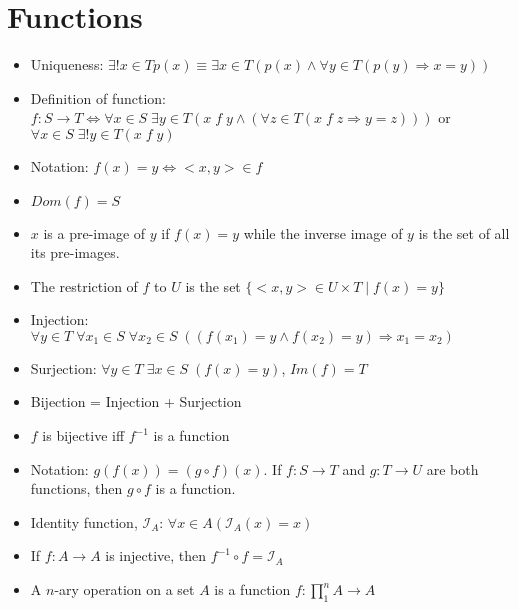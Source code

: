 \documentclass[11pt, twocolumn]{article}
\newenvironment{compactitem}
{\begin{itemize}
  \setlength{\itemsep}{1px}
  \setlength{\parskip}{0pt}
  \setlength{\parsep}{0pt}}
{\end{itemize}}
\begin{document}
\section{Functions}
\begin{compactitem}
\item Uniqueness: $\exists!x\in T p(x) \equiv \exists x \in T (p(x) \wedge \forall y \in T (p(y) \Rightarrow x=y))$ 
\item Definition of function: $f: S \rightarrow T \Leftrightarrow \forall x \in S \;\exists y \in T (x\;f\;y \wedge (\forall z \in T (x\;f\;z \Rightarrow y=z)))$ or $\forall x\in S \;\exists!y \in T (x\;f\;y)$
\item Notation: $f(x)=y \Leftrightarrow <x,y>\in f$
\item $Dom(f) = S$
\item $x$ is a pre-image of $y$ if $f(x)=y$ while the inverse image of $y$ is the set of all its pre-images.
\item The restriction of $f$ to $U$ is the set $\{<x,y>\in U\times T\;|\;f(x)=y\}$
\item Injection: $\forall y \in T \;\forall x_1 \in S \;\forall x_2 \in S \;((f(x_1)=y\wedge f(x_2)=y)\Rightarrow x_1=x_2)$ 
\item Surjection: $\forall y \in T \; \exists x \in S \; (f(x)=y)$, $Im(f)=T$
\item Bijection = Injection + Surjection
\item $f$ is bijective iff $f^{-1}$ is a function
\item Notation: $g(f(x)) = (g\circ f)(x)$. If $f: S \rightarrow T$ and $g: T \rightarrow U$ are both functions, then $g\circ f$ is a function.
\item Identity function, $\mathcal{I}_A$: $\forall x \in A (\mathcal{I}_A(x)=x)$ 
\item If $f: A \rightarrow A$ is injective, then $f^{-1} \circ f = \mathcal{I}_A$
\item A $n$-ary operation on a set $A$ is a function $f: \prod^n_1A\rightarrow A$
\end{compactitem}
\end{document}
